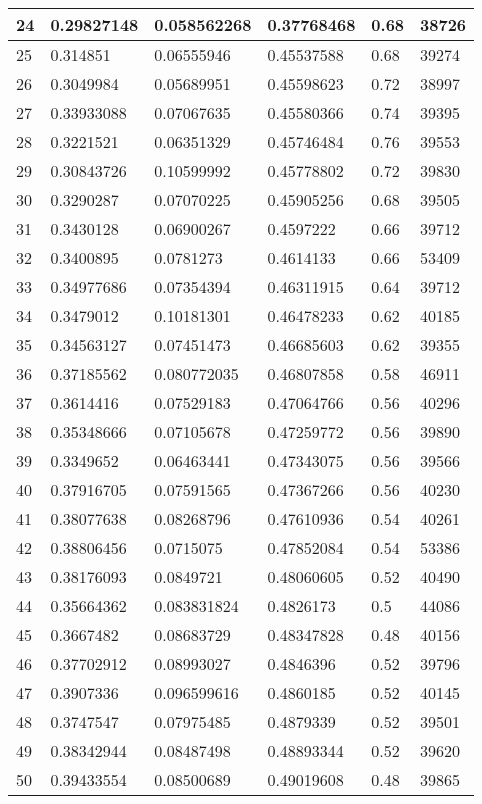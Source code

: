 \begin{longtable}{|l|l|l|l|l|l|}
24 & 0.29827148 & 0.058562268 & 0.37768468 & 0.68 & 38726 \\ \hline 
25 & 0.314851 & 0.06555946 & 0.45537588 & 0.68 & 39274 \\ \hline 
26 & 0.3049984 & 0.05689951 & 0.45598623 & 0.72 & 38997 \\ \hline 
27 & 0.33933088 & 0.07067635 & 0.45580366 & 0.74 & 39395 \\ \hline 
28 & 0.3221521 & 0.06351329 & 0.45746484 & 0.76 & 39553 \\ \hline 
29 & 0.30843726 & 0.10599992 & 0.45778802 & 0.72 & 39830 \\ \hline 
30 & 0.3290287 & 0.07070225 & 0.45905256 & 0.68 & 39505 \\ \hline 
31 & 0.3430128 & 0.06900267 & 0.4597222 & 0.66 & 39712 \\ \hline 
32 & 0.3400895 & 0.0781273 & 0.4614133 & 0.66 & 53409 \\ \hline 
33 & 0.34977686 & 0.07354394 & 0.46311915 & 0.64 & 39712 \\ \hline 
34 & 0.3479012 & 0.10181301 & 0.46478233 & 0.62 & 40185 \\ \hline 
35 & 0.34563127 & 0.07451473 & 0.46685603 & 0.62 & 39355 \\ \hline 
36 & 0.37185562 & 0.080772035 & 0.46807858 & 0.58 & 46911 \\ \hline 
37 & 0.3614416 & 0.07529183 & 0.47064766 & 0.56 & 40296 \\ \hline 
38 & 0.35348666 & 0.07105678 & 0.47259772 & 0.56 & 39890 \\ \hline 
39 & 0.3349652 & 0.06463441 & 0.47343075 & 0.56 & 39566 \\ \hline 
40 & 0.37916705 & 0.07591565 & 0.47367266 & 0.56 & 40230 \\ \hline 
41 & 0.38077638 & 0.08268796 & 0.47610936 & 0.54 & 40261 \\ \hline 
42 & 0.38806456 & 0.0715075 & 0.47852084 & 0.54 & 53386 \\ \hline 
43 & 0.38176093 & 0.0849721 & 0.48060605 & 0.52 & 40490 \\ \hline 
44 & 0.35664362 & 0.083831824 & 0.4826173 & 0.5 & 44086 \\ \hline 
45 & 0.3667482 & 0.08683729 & 0.48347828 & 0.48 & 40156 \\ \hline 
46 & 0.37702912 & 0.08993027 & 0.4846396 & 0.52 & 39796 \\ \hline 
47 & 0.3907336 & 0.096599616 & 0.4860185 & 0.52 & 40145 \\ \hline 
48 & 0.3747547 & 0.07975485 & 0.4879339 & 0.52 & 39501 \\ \hline 
49 & 0.38342944 & 0.08487498 & 0.48893344 & 0.52 & 39620 \\ \hline 
50 & 0.39433554 & 0.08500689 & 0.49019608 & 0.48 & 39865 \\ \hline 
\end{longtable}